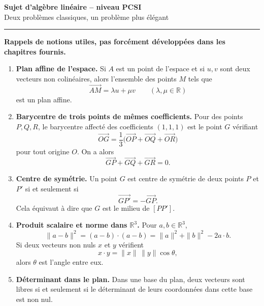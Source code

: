 \documentclass[11pt,a4paper]{article}
\newcommand{\R}{\mathbb{R}}
\begin{document}
\begin{center}
    {\LARGE\bfseries\color{bleu} Sujet d'algèbre linéaire -- niveau PCSI}\\[0.4em]
    {\large Deux problèmes classiques, un problème plus élégant}\\[0.6em]
    \rule{0.85\linewidth}{0.8pt}
\end{center}

\vspace{0.4em}

\begin{rappelbox}
\textbf{Rappels de notions utiles, pas forcément développées dans les chapitres fournis.}
\begin{enumerate}[label=\arabic*)]
    \item \textbf{Plan affine de l'espace.} Si $A$ est un point de l'espace et si $u,v$ sont deux vecteurs non colinéaires, alors l'ensemble des points $M$ tels que
    \[
    \overrightarrow{AM}=\lambda u+\mu v \qquad (\lambda,\mu\in\R)
    \]
    est un plan affine.
    
    \item \textbf{Barycentre de trois points de mêmes coefficients.} Pour des points $P,Q,R$, le barycentre affecté des coefficients $(1,1,1)$ est le point $G$ vérifiant
    \[
    \overrightarrow{OG}=\frac13\bigl(\overrightarrow{OP}+\overrightarrow{OQ}+\overrightarrow{OR}\bigr)
    \]
    pour tout origine $O$. On a alors
    \[
    \overrightarrow{GP}+\overrightarrow{GQ}+\overrightarrow{GR}=0.
    \]
    
    \item \textbf{Centre de symétrie.} Un point $G$ est centre de symétrie de deux points $P$ et $P'$ si et seulement si
    \[
    \overrightarrow{GP'}=-\overrightarrow{GP}.
    \]
    Cela équivaut à dire que $G$ est le milieu de $[PP']$.
    
    \item \textbf{Produit scalaire et norme dans $\R^3$.} Pour $a,b\in\R^3$,
    \[
    \|a-b\|^2=(a-b)\cdot(a-b)=\|a\|^2+\|b\|^2-2a\cdot b.
    \]
    Si deux vecteurs non nuls $x$ et $y$ vérifient
    \[
    x\cdot y=\|x\|\,\|y\|\cos\theta,
    \]
    alors $\theta$ est l'angle entre eux.
    
    \item \textbf{Déterminant dans le plan.} Dans une base du plan, deux vecteurs sont libres si et seulement si le déterminant de leurs coordonnées dans cette base est non nul.
\end{enumerate}
\end{rappelbox}
\end{document}
